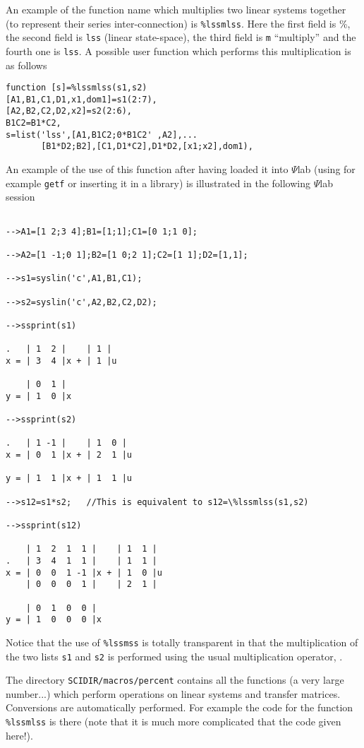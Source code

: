 	An example of the function name which multiplies two
linear systems together (to represent their series inter-connection)
is {\tt \%lssmlss}.  Here the first field is \%, the second field is 
{\tt lss} (linear state-space), the third field is {\tt m} ``multiply''
and the fourth one is {\tt lss}. A possible user function which performs
this multiplication is as follows
\begin{verbatim}
function [s]=%lssmlss(s1,s2)
[A1,B1,C1,D1,x1,dom1]=s1(2:7),
[A2,B2,C2,D2,x2]=s2(2:6),
B1C2=B1*C2,
s=list('lss',[A1,B1C2;0*B1C2' ,A2],...
       [B1*D2;B2],[C1,D1*C2],D1*D2,[x1;x2],dom1),
\end{verbatim}
An example of the use of this function after having loaded it into
$\Psi$lab (using for example {\tt getf} or inserting it in a library) 
is illustrated in the following $\Psi$lab session
\begin{verbatim}
 
-->A1=[1 2;3 4];B1=[1;1];C1=[0 1;1 0];
 
-->A2=[1 -1;0 1];B2=[1 0;2 1];C2=[1 1];D2=[1,1];
 
-->s1=syslin('c',A1,B1,C1);
 
-->s2=syslin('c',A2,B2,C2,D2);
 
-->ssprint(s1)
 
.   | 1  2 |    | 1 |    
x = | 3  4 |x + | 1 |u   
 
    | 0  1 |    
y = | 1  0 |x   
 
-->ssprint(s2)
 
.   | 1 -1 |    | 1  0 |    
x = | 0  1 |x + | 2  1 |u   
 
y = | 1  1 |x + | 1  1 |u   
 
-->s12=s1*s2;   //This is equivalent to s12=\%lssmlss(s1,s2)
 
-->ssprint(s12)
 
    | 1  2  1  1 |    | 1  1 |    
.   | 3  4  1  1 |    | 1  1 |    
x = | 0  0  1 -1 |x + | 1  0 |u   
    | 0  0  0  1 |    | 2  1 |    
 
    | 0  1  0  0 |    
y = | 1  0  0  0 |x   
\end{verbatim}
Notice that the use of {\tt \%lssmss} is totally transparent in
that the multiplication of the two lists {\tt s1} and {\tt s2}
is performed using the usual multiplication operator, {\tt *}.

The directory {\tt SCIDIR/macros/percent} contains all the functions
(a very large number...) which perform operations on linear systems
and transfer matrices. Conversions are automatically performed.
For example the code for the function {\tt \%lssmlss} is there (note
that it is much more complicated that the code given here!).
